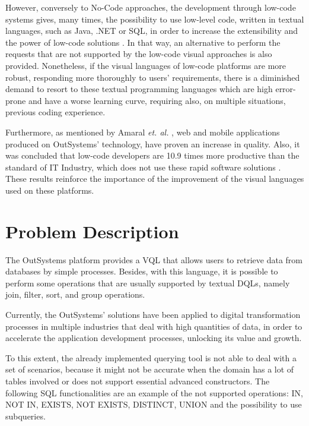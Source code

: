 However, conversely to No-Code approaches, the development through low-code systems gives, many times, the possibility to use low-level code, written in textual languages, such as Java, .NET or \gls{SQL}, in order to increase the extensibility and the power of low-code solutions \cite{outsystems_lowcodeVsNocode}. In that way, an alternative to perform the requests that are not supported by the low-code visual approaches is also provided. Nonetheless, if the visual languages of low-code platforms are more robust, responding more thoroughly to users’ requirements, there is a diminished demand to resort to these textual programming languages which are high error-prone and have a worse learning curve, requiring also, on multiple situations, previous coding experience.

Furthermore, as mentioned by  Amaral \textit{et. al.} \cite{improvingTheDeveloperExperienceWithALowCodeProcessModellingLanguage}, web and mobile applications produced on OutSystems’ technology, have proven an increase in quality. Also, it was concluded that low-code developers are 10.9 times more productive than the standard of \gls{IT} Industry, which does not use these rapid software solutions \cite{outByNumbers2013}. These results reinforce the importance of the improvement of the visual languages used on these platforms.


\section{Problem Description}
\label{sec:problem_description}
The OutSystems platform provides a \gls{VQL} that allows users to retrieve data from databases by simple processes. Besides, with this language, it is possible to perform some operations that are usually supported by textual \glspl{DQL}, namely join, filter, sort, and group operations.

Currently, the OutSystems’ solutions have been applied to digital transformation processes in multiple industries that deal with high quantities of data, in order to accelerate the application development processes, unlocking its value and growth.

To this extent, the already implemented querying tool is not able to deal with a set of scenarios, because it might not be accurate when the domain has a lot of tables involved or does not support essential advanced constructors. The following \gls{SQL} functionalities are an example of the not supported operations: IN, NOT IN, EXISTS, NOT EXISTS, DISTINCT, UNION and the possibility to use subqueries.

